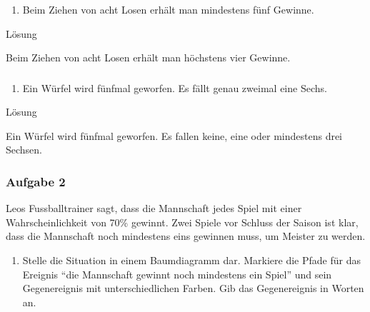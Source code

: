 \documentclass[
  ngerman,
]{book}
\providecommand{\tightlist}{%
  \setlength{\itemsep}{0pt}\setlength{\parskip}{0pt}}
\begin{document}
\hypertarget{section-167}{%
\subsubsection*{}\label{section-167}}

\begin{enumerate}
\def\labelenumi{\alph{enumi})}
\setcounter{enumi}{7}
\tightlist
\item
  Beim Ziehen von acht Losen erhält man mindestens fünf Gewinne.
\end{enumerate}

Lösung

Beim Ziehen von acht Losen erhält man höchstens vier Gewinne.

\hypertarget{section-168}{%
\subsubsection*{}\label{section-168}}

\begin{enumerate}
\def\labelenumi{\roman{enumi})}
\tightlist
\item
  Ein Würfel wird fünfmal geworfen. Es fällt genau zweimal eine Sechs.
\end{enumerate}

Lösung

Ein Würfel wird fünfmal geworfen. Es fallen keine, eine oder mindestens drei Sechsen.

\hypertarget{section-169}{%
\subsubsection*{}\label{section-169}}

\hypertarget{aufgabe-2-17}{%
\subsubsection*{Aufgabe 2}\label{aufgabe-2-17}}

Leos Fussballtrainer sagt, dass die Mannschaft jedes Spiel mit einer Wahrscheinlichkeit von 70\% gewinnt. Zwei Spiele vor Schluss der Saison ist klar, dass die Mannschaft noch mindestens eins gewinnen muss, um Meister zu werden.

\begin{enumerate}
\def\labelenumi{\alph{enumi})}
\tightlist
\item
  Stelle die Situation in einem Baumdiagramm dar. Markiere die Pfade für das Ereignis ``die Mannschaft gewinnt noch mindestens ein Spiel'' und sein Gegenereignis mit unterschiedlichen Farben. Gib das Gegenereignis in Worten an.
\end{enumerate}
\end{document}
